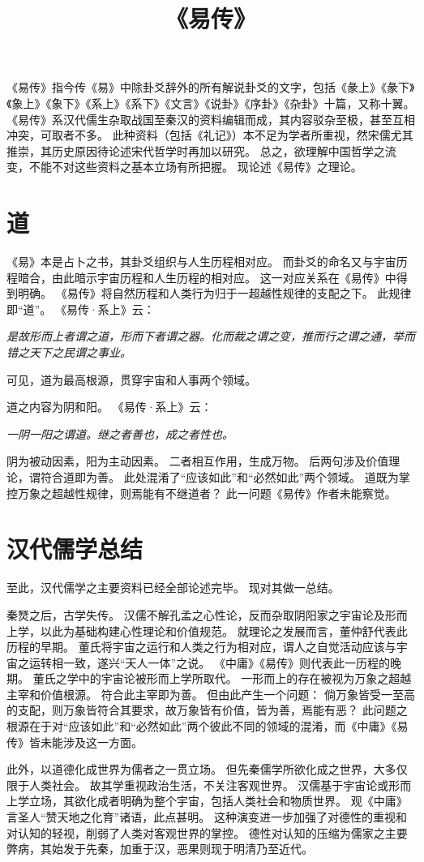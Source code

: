 \documentclass[11pt]{article}
\title{《易传》}
\date{}
\begin{document}
  \maketitle

  \linenumbers
《易传》指今传《易》中除卦爻辞外的所有解说卦爻的文字，包括《彖上》《彖下》《象上》《象下》《系上》《系下》《文言》《说卦》《序卦》《杂卦》十篇，又称十翼。
《易传》系汉代儒生杂取战国至秦汉的资料编辑而成，其内容驳杂至极，甚至互相冲突，可取者不多。
此种资料（包括《礼记》）本不足为学者所重视，然宋儒尤其推崇，其历史原因待论述宋代哲学时再加以研究。
总之，欲理解中国哲学之流变，不能不对这些资料之基本立场有所把握。
现论述《易传》之理论。

\section{道}
《易》本是占卜之书，其卦爻组织与人生历程相对应。
而卦爻的命名又与宇宙历程暗合，由此暗示宇宙历程和人生历程的相对应。
这一对应关系在《易传》中得到明确。
《易传》将自然历程和人类行为归于一超越性规律的支配之下。
此规律即“道”。
《易传·系上》云：

\textit{是故形而上者谓之道，形而下者谓之器。化而裁之谓之变，推而行之谓之通，举而错之天下之民谓之事业。}

可见，道为最高根源，贯穿宇宙和人事两个领域。

\par

道之内容为阴和阳。
《易传·系上》云：
    
\textit{一阴一阳之谓道。继之者善也，成之者性也。}

阴为被动因素，阳为主动因素。
二者相互作用，生成万物。
后两句涉及价值理论，谓符合道即为善。
此处混淆了“应该如此”和“必然如此”两个领域。
道既为掌控万象之超越性规律，则焉能有不继道者？
此一问题《易传》作者未能察觉。

\section{汉代儒学总结}
至此，汉代儒学之主要资料已经全部论述完毕。
现对其做一总结。

\par

秦燹之后，古学失传。
汉儒不解孔孟之心性论，反而杂取阴阳家之宇宙论及形而上学，以此为基础构建心性理论和价值规范。
就理论之发展而言，董仲舒代表此历程的早期。
董氏将宇宙之运行和人类之行为相对应，谓人之自觉活动应该与宇宙之运转相一致，遂兴“天人一体”之说。
《中庸》《易传》则代表此一历程的晚期。
董氏之学中的宇宙论被形而上学所取代。
一形而上的存在被视为万象之超越主宰和价值根源。
符合此主宰即为善。
但由此产生一个问题：
倘万象皆受一至高的支配，则万象皆符合其要求，故万象皆有价值，皆为善，焉能有恶？
此问题之根源在于对“应该如此”和“必然如此”两个彼此不同的领域的混淆，而《中庸》《易传》皆未能涉及这一方面。

\par

此外，以道德化成世界为儒者之一贯立场。
但先秦儒学所欲化成之世界，大多仅限于人类社会。
故其学重视政治生活，不关注客观世界。
汉儒基于宇宙论或形而上学立场，其欲化成者明确为整个宇宙，包括人类社会和物质世界。
观《中庸》言圣人“赞天地之化育”诸语，此点甚明。
这种演变进一步加强了对德性的重视和对认知的轻视，削弱了人类对客观世界的掌控。
德性对认知的压缩为儒家之主要弊病，其始发于先秦，加重于汉，恶果则现于明清乃至近代。
 
\end{document}
